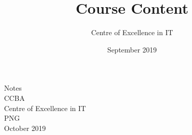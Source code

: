 \documentclass[a4paper]{article}
\title{Course Content}
\author{Centre of Excellence in IT}
\date{September 2019}
\begin{document}
\begin{center}
Notes \\
{\Huge
\vspace{4cm}
CCBA \\
\vspace{7cm}
Centre of Excellence in IT\\ PNG \\ 
\vspace{7cm}
}
October 2019
\end{center}

\newpage


\end{document}
